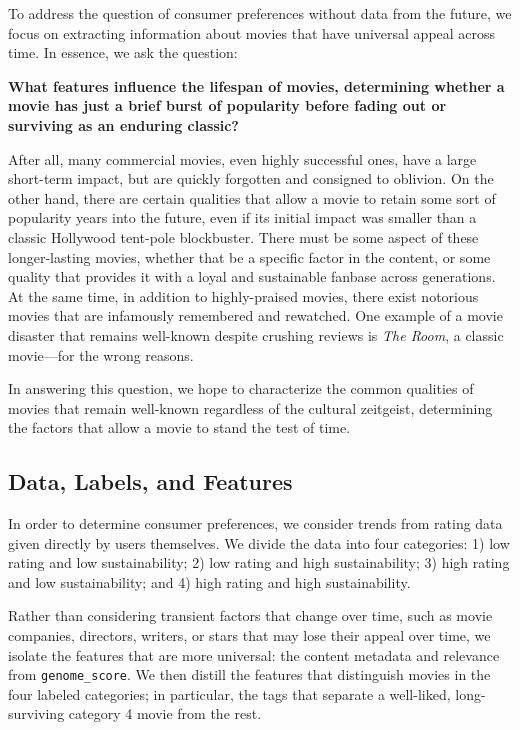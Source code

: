 \documentclass[12pt]{article}
\begin{document}
To address the question of consumer preferences without data from the future, we focus on extracting information about movies that have universal appeal across time. In essence, we ask the question:

\textbf{What features influence the lifespan of movies, determining whether a movie has just a brief burst of popularity before fading out or surviving as an enduring classic?}

After all, many commercial movies, even highly successful ones, have a large short-term impact, but are quickly forgotten and consigned to oblivion. On the other hand, there are certain qualities that allow a movie to retain some sort of popularity years into the future, even if its initial impact was smaller than a classic Hollywood tent-pole blockbuster. There must be some aspect of these longer-lasting movies, whether that be a specific factor in the content, or some quality that provides it with a loyal and sustainable fanbase across generations. At the same time, in addition to highly-praised movies, there exist notorious movies that are infamously remembered and rewatched. One example of a movie disaster that remains well-known despite crushing reviews is \textit{The Room}, a classic movie—for the wrong reasons.

In answering this question, we hope to characterize the common qualities of movies that remain well-known regardless of the cultural zeitgeist, determining the factors that allow a movie to stand the test of time. 

\subsection{Data, Labels, and Features}
In order to determine consumer preferences, we consider trends from rating data given directly by users themselves. We divide the data into four categories: 1) low rating and low sustainability; 2) low rating and high sustainability; 3) high rating and low sustainability; and 4) high rating and high sustainability.

Rather than considering transient factors that change over time, such as movie companies, directors, writers, or stars that may lose their appeal over time, we isolate the features that are more universal: the content metadata and relevance from \texttt{genome\_score}. We then distill the features that distinguish movies in the four labeled categories; in particular, the tags that separate a well-liked, long-surviving category 4 movie from the rest. 
\end{document}
